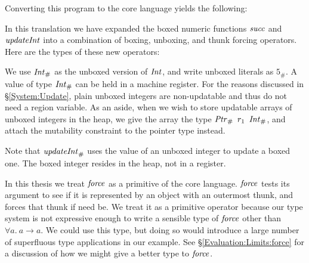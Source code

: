 Converting this program to the core language yields the following:


In this translation we have expanded the boxed numeric functions $\operatorname{\mathit{succ}}$ and $\operatorname{\mathit{updateInt}}$ into a combination of boxing, unboxing, and thunk forcing operators. Here are the types of these new operators:


We use $\operatorname{\mathit{Int}}_{\#}$ as the unboxed version of $\operatorname{\mathit{Int}}$, and write unboxed literals as $5_{\#}$. A value of type $\operatorname{\mathit{Int}}_{\#}$ can be held in a machine register. For the reasons discussed in \S\ref{System:Update}, plain unboxed integers are non-updatable and thus do not need a region variable. As an aside, when we wish to store updatable arrays of unboxed integers in the heap, we give the array the type $\iPtr_{\#} \ r_1 \ \iInt_{\#}$, and attach the mutability constraint to the pointer type instead.

Note that $\operatorname{\mathit{updateInt}}_{\#}$ uses the value of an unboxed integer to update a boxed one. The boxed integer resides in the heap, not in a register.

In this thesis we treat $\operatorname{\mathit{force}}$ as a primitive of the core language. $\operatorname{\mathit{force}}$ tests its argument to see if it is represented by an object with an outermost thunk, and forces that thunk if need be. We treat it as a primitive operator because our type system is not expressive enough to write a sensible type of $\operatorname{\mathit{force}}$ other than $\forall a. \ a \to a$. We could use this type, but doing so would introduce a large number of superfluous type applications in our example. See \S\ref{Evaluation:Limits:force} for a discussion of how we might give a better type to $\operatorname{\mathit{force}}$.

